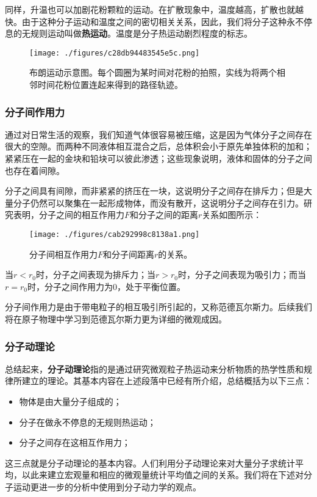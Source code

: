 同样，升温也可以加剧花粉颗粒的运动。在扩散现象中，温度越高，扩散也就越快。由于这种分子运动和温度之间的密切相关关系，因此，我们将分子这种永不停息的无规则运动叫做\textbf{热运动}。温度是分子热运动剧烈程度的标志。
\begin{figure}[ht]
\centering
\texttt{[image: ./figures/c28db94483545e5c.png]}
\caption{布朗运动示意图。每个圆圈为某时间对花粉的拍照，实线为将两个相邻时间花粉位置连起来得到的路径轨迹。} \label{fig_thermo}
\end{figure}

\subsubsection{分子间作用力}
通过对日常生活的观察，我们知道气体很容易被压缩，这是因为气体分子之间存在很大的空隙。而两种不同液体相互混合之后，总体积会小于原先单独体积的加和；紧紧压在一起的金块和铅块可以彼此渗透；这些现象说明，液体和固体的分子之间也存在着间隙。

分子之间具有间隙，而非紧紧的挤压在一块，这说明分子之间存在排斥力；但是大量分子仍然可以聚集在一起形成物体，而没有散开，这说明分子之间存在引力。研究表明，分子之间的相互作用力$F$和分子之间的距离$r$关系如图所示：
\begin{figure}[ht]
\centering
\texttt{[image: ./figures/cab292998c8138a1.png]}
\caption{分子间相互作用力$F$和分子间距离$r$的关系。} \label{fig_thermo_2}
\end{figure}
当$r<r_0$时，分子之间表现为排斥力；当$r>r_0$时，分子之间表现为吸引力；而当$r=r_0$时，分子之间作用力为$0$，处于平衡位置。

分子间作用力是由于带电粒子的相互吸引所引起的，又称范德瓦尔斯力。后续我们将在原子物理中学习到范德瓦尔斯力更为详细的微观成因。
\subsubsection{分子动理论}
总结起来，\textbf{分子动理论}指的是通过研究微观粒子热运动来分析物质的热学性质和规律所建立的理论。其基本内容在上述段落中已经有所介绍，总结概括为以下三点：
\begin{itemize}
\item 物体是由大量分子组成的；
\item  分子在做永不停息的无规则热运动；
\item 分子之间存在这相互作用力；
\end{itemize}这三点就是分子动理论的基本内容。人们利用分子动理论来对大量分子求统计平均，以此来建立宏观量和相应的微观量统计平均值之间的关系。我们将在下述对分子运动更进一步的分析中使用到分子动力学的观点。

